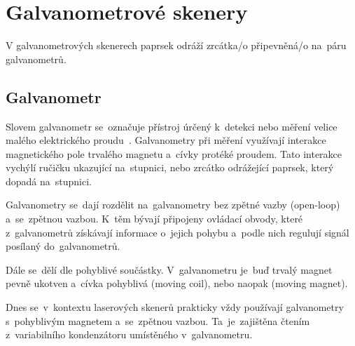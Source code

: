 \section{Galvanometrové skenery}
V galvanometrových skenerech paprsek odráží zrcátka/o připevněná/o na~páru galvanometrů.

\subsection{Galvanometr}
Slovem galvanometr se~označuje přístroj úrčený k~detekci nebo měření velice malého elektrického proudu~\cite{galvo-definition}. Galvanometry při měření využívají interakce magnetického pole trvalého magnetu a~cívky protéké proudem. Tato interakce vychýlí ručičku ukazující na~stupnici, nebo zrcátko odrážející paprsek, který dopadá na~stupnici.~\cite{wiki-galvo}

Galvanometry se~dají rozdělit na~galvanometry bez zpětné vazby (open-loop) a~se~zpětnou vazbou. K~těm bývají připojeny ovládací obvody, které z~galvanometrů získávají informace o~jejich pohybu a~podle nich regulují signál posílaný do~galvanometrů.~\cite{wiki-galvo}

Dále se~dělí dle pohyblivé součástky. V~galvanometru je~buď trvalý magnet pevně ukotven a~cívka pohyblivá (moving coil), nebo naopak (moving magnet). %

Dnes se~v~kontextu laserových skenerů prakticky vždy používají galvanometry s~pohyblivým magnetem a~se~zpětnou vazbou. Ta~je~zajištěna čtením z~variabilního kondenzátoru umístěného v~galvanometru.

